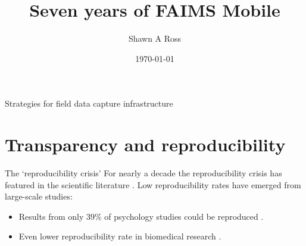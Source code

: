 \documentclass[aspectratio=169, 12pt]{beamer} %
\title{Seven years of FAIMS Mobile} %
\author{Shawn A Ross}               %
\institute{Office of the Deputy Vice-Chancellor (Research)}         %
\date{\today}                 %
\begin{document}

\maketitle

  

\begin{frame}{Strategies for field data capture infrastructure}
  \tableofcontents
\end{frame}

%


\section{Transparency and reproducibility}

\begin{frame}{The `reproducibility crisis'}
  For nearly a decade the reproducibility crisis has featured in the scientific literature \cite{Jasny2011-bw, Baker2016-cf, Munafo2017-bj}. Low reproducibility rates have emerged from large-scale studies:
    \begin{itemize}[label=\textbullet]
        \item Results from only 39\% of psychology studies could be reproduced \cite{Open_Science_Collaboration2015-vf}.
        \item Even lower reproducibility rate in biomedical research \cite{Begley2012-xt,Prinz2011-za}.
    \end{itemize}
\end{frame}
\end{document}
